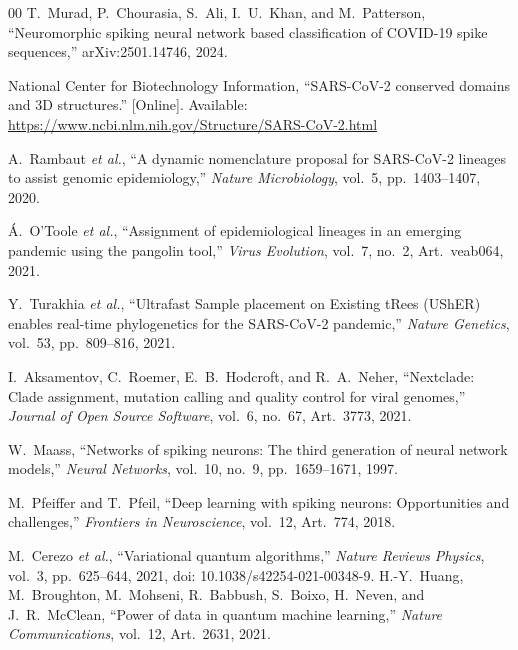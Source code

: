 \documentclass[conference]{IEEEtran}
\begin{document}
\FloatBarrier
\begin{thebibliography}{00}
T.~Murad, P.~Chourasia, S.~Ali, I.~U.~Khan, and M.~Patterson,
``Neuromorphic spiking neural network based classification of COVID-19 spike sequences,''
arXiv:2501.14746, 2024.

National Center for Biotechnology Information,
``SARS-CoV-2 conserved domains and 3D structures.''
[Online]. Available: \url{https://www.ncbi.nlm.nih.gov/Structure/SARS-CoV-2.html}

A.~Rambaut \textit{et al.},
``A dynamic nomenclature proposal for SARS-CoV-2 lineages to assist genomic epidemiology,''
\textit{Nature Microbiology}, vol.~5, pp.~1403--1407, 2020.

\'{A}.~O'Toole \textit{et al.},
``Assignment of epidemiological lineages in an emerging pandemic using the pangolin tool,''
\textit{Virus Evolution}, vol.~7, no.~2, Art.~veab064, 2021.

Y.~Turakhia \textit{et al.},
``Ultrafast Sample placement on Existing tRees (UShER) enables real-time phylogenetics for the SARS-CoV-2 pandemic,''
\textit{Nature Genetics}, vol.~53, pp.~809--816, 2021.

I.~Aksamentov, C.~Roemer, E.~B.~Hodcroft, and R.~A.~Neher,
``Nextclade: Clade assignment, mutation calling and quality control for viral genomes,''
\textit{Journal of Open Source Software}, vol.~6, no.~67, Art.~3773, 2021.

W.~Maass,
``Networks of spiking neurons: The third generation of neural network models,''
\textit{Neural Networks}, vol.~10, no.~9, pp.~1659--1671, 1997.

M.~Pfeiffer and T.~Pfeil,
``Deep learning with spiking neurons: Opportunities and challenges,''
\textit{Frontiers in Neuroscience}, vol.~12, Art.~774, 2018.

M.~Cerezo \textit{et al.},
``Variational quantum algorithms,''
\textit{Nature Reviews Physics}, vol.~3, pp.~625--644, 2021,
doi: 10.1038/s42254-021-00348-9.
H.-Y.~Huang, M.~Broughton, M.~Mohseni, R.~Babbush, S.~Boixo, H.~Neven, and J.~R.~McClean,
``Power of data in quantum machine learning,''
\textit{Nature Communications}, vol.~12, Art.~2631, 2021.


\end{thebibliography}
\end{document}
